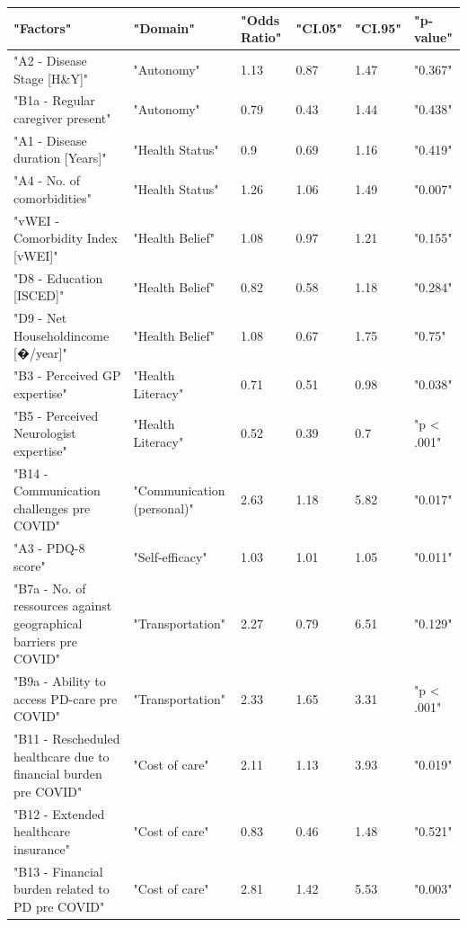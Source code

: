 \documentclass{bmcart}
\begin{document}
\begin{backmatter}
\begin{table}[!ht]
    \centering
    \begin{tabular}{|l|l|l|l|l|l|}
    \hline
        "Factors" & "Domain" & "Odds Ratio" & "CI.05" & "CI.95" & "p-value" \\ \hline
        "A2 - Disease Stage [H\&Y]" & "Autonomy" & 1.13 & 0.87 & 1.47 & "0.367" \\ \hline
        "B1a - Regular caregiver present" & "Autonomy" & 0.79 & 0.43 & 1.44 & "0.438" \\ \hline
        "A1 - Disease duration [Years]" & "Health Status" & 0.9 & 0.69 & 1.16 & "0.419" \\ \hline
        "A4 - No. of comorbidities" & "Health Status" & 1.26 & 1.06 & 1.49 & "0.007" \\ \hline
        "vWEI - Comorbidity Index [vWEI]" & "Health Belief" & 1.08 & 0.97 & 1.21 & "0.155" \\ \hline
        "D8 - Education [ISCED]" & "Health Belief" & 0.82 & 0.58 & 1.18 & "0.284" \\ \hline
        "D9 - Net Householdincome [�/year]" & "Health Belief" & 1.08 & 0.67 & 1.75 & "0.75" \\ \hline
        "B3 - Perceived GP expertise" & "Health Literacy" & 0.71 & 0.51 & 0.98 & "0.038" \\ \hline
        "B5 - Perceived Neurologist expertise" & "Health Literacy" & 0.52 & 0.39 & 0.7 & "p < .001" \\ \hline
        "B14 - Communication challenges pre COVID" & "Communication (personal)" & 2.63 & 1.18 & 5.82 & "0.017" \\ \hline
        "A3 - PDQ-8 score" & "Self-efficacy" & 1.03 & 1.01 & 1.05 & "0.011" \\ \hline
        "B7a - No. of ressources against geographical barriers pre COVID" & "Transportation" & 2.27 & 0.79 & 6.51 & "0.129" \\ \hline
        "B9a - Ability to access PD-care pre COVID" & "Transportation" & 2.33 & 1.65 & 3.31 & "p < .001" \\ \hline
        "B11 - Rescheduled healthcare due to financial burden pre COVID" & "Cost of care" & 2.11 & 1.13 & 3.93 & "0.019" \\ \hline
        "B12 - Extended healthcare insurance" & "Cost of care" & 0.83 & 0.46 & 1.48 & "0.521" \\ \hline
        "B13 - Financial burden related to PD pre COVID" & "Cost of care" & 2.81 & 1.42 & 5.53 & "0.003" \\ \hline

\end{tabular}
\end{table}
\end{backmatter}
\end{document}
